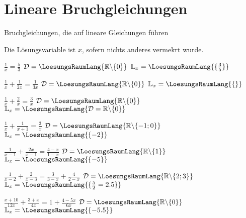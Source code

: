 

\renewcommand{\bbwAufgabenBlockID}{GL\_Br}



\usepackage{amssymb} %
\renewcommand{\metaHeaderLine}{Arbeitsblatt}
\renewcommand{\arbeitsblattTitel}{Bruchgleichungen}

\arbeitsblattHeader{}

\section{Lineare Bruchgleichungen}
Bruchgleichungen, die auf lineare Gleichungen führen

Die Lösungsvariable ist $x$, sofern nichts anderes vermekrt wurde.


\begin{bbwAufgabenBlock}
\item $\frac1x = \frac53$     \hspace{10mm}              $\mathcal{D}= \LoesungsRaumLang{\mathbb{R}\backslash\{0\}}$    $\mathbb{L}_x = \LoesungsRaumLang{\{\frac35\}}$
\item $\frac1x + \frac1{2x} = \frac1{3x}$ \hspace{10mm}   $\mathcal{D}= \LoesungsRaumLang{\mathbb{R}\backslash\{0\}}$    $\mathbb{L}_x = \LoesungsRaumLang{\{\}}$\noTRAINER{\newpage}
\item $\frac1x + \frac2x = \frac3x$  \hspace{10mm}       $\mathcal{D}= \LoesungsRaumLang{\mathbb{R}\backslash\{0\}}$    $\mathbb{L}_x = \LoesungsRaumLang{\mathcal{D}=\mathbb{R}\backslash\{0\}}$
\item $\frac1x + \frac1{x+1} = \frac3x$ \hspace{10mm}    $\mathcal{D}= \LoesungsRaumLang{\mathbb{R}\backslash\{-1;0\}}$ $\mathbb{L}_x = \LoesungsRaumLang{\{-2\}}$
\item $\frac1{x-1} + \frac{2x}{x-1} = \frac{4-x}{1-x}$ \hspace{10mm}    $\mathcal{D}= \LoesungsRaumLang{\mathbb{R}\backslash\{1\}}$ $\mathbb{L}_x = \LoesungsRaumLang{\{-5\}}$\noTRAINER{\newpage}
\item $\frac1{x-2} + \frac{2}{x-3} = \frac3{3-x} + \frac{4}{2-x}$ \hspace{10mm}    $\mathcal{D}= \LoesungsRaumLang{\mathbb{R}\backslash\{2;3\}}$ $\mathbb{L}_x = \LoesungsRaumLang{\{\frac{5}{2}=2.5\}}$
\item $\frac{x+10}{12x} + \frac{3+x}{4x} = 1 + \frac{4-5x}{6x}$ \hspace{10mm}    $\mathcal{D}= \LoesungsRaumLang{\mathbb{R}\backslash\{0\}}$ $\mathbb{L}_x = \LoesungsRaumLang{\{-5.5\}}$
\end{bbwAufgabenBlock}

